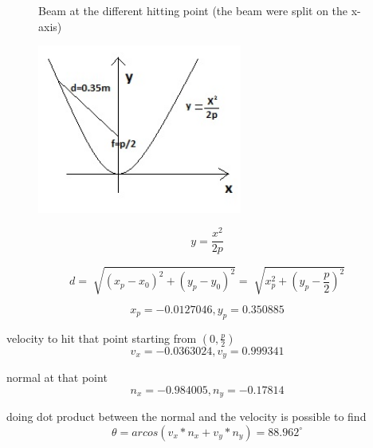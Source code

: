 \documentclass[a4paper]{article}
\begin{document}
\begin{figure}[H]
    \caption{Beam at the different hitting point (the beam were split on the x-axis)}

\end{figure}


\newpage
\newpage
{}

\begin{figure}[H]
\centering
\includegraphics[width=0.6\textwidth]{pparabola.jpg}
\end{figure}

\begin{equation*}
y=\frac{x^2}{2p}
\end{equation*}

\begin{equation*}
d=\sqrt[]{(x_p-x_0)^2+(y_p-y_0)^2}=\sqrt[]{x_p^2+(y_p-\frac{p}{2})^2}
\end{equation*}

\begin{equation*}
x_p=-0.0127046, y_p=0.350885
\end{equation*}

velocity to hit that point starting from $(0, \frac{p}{2})$
\begin{equation*}
v_x=-0.0363024, v_y=0.999341
\end{equation*}

normal at that point
\begin{equation*}
n_x=-0.984005, n_y=-0.17814
\end{equation*}

doing dot product between the normal and the velocity is possible to find
\begin{equation*} 
\theta=arcos(v_x*n_x+v_y*n_y)=88.962^\circ
\end{equation*}


\nocite{*}


\end{document}
